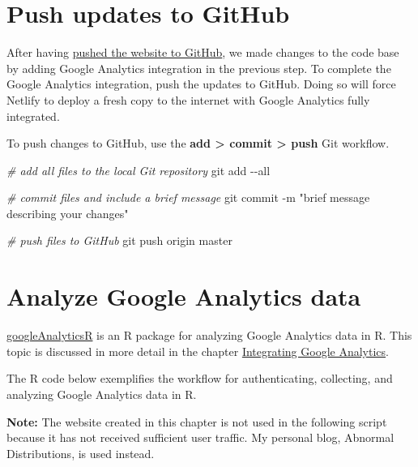 \documentclass[
]{book}
\newenvironment{Shaded}{\begin{snugshade}}{\end{snugshade}}
\newcommand{\AttributeTok}[1]{\textcolor[rgb]{0.77,0.63,0.00}{#1}}
\newcommand{\CommentTok}[1]{\textcolor[rgb]{0.56,0.35,0.01}{\textit{#1}}}
\newcommand{\FunctionTok}[1]{\textcolor[rgb]{0.00,0.00,0.00}{#1}}
\newcommand{\NormalTok}[1]{#1}
\newcommand{\StringTok}[1]{\textcolor[rgb]{0.31,0.60,0.02}{#1}}
\begin{document}
\hypertarget{push-updates-to-github}{%
\section{Push updates to GitHub}\label{push-updates-to-github}}

After having \protect\hyperlink{push-demo}{pushed the website to GitHub}, we made changes to the code base by adding Google Analytics integration in the previous step. To complete the Google Analytics integration, push the updates to GitHub. Doing so will force Netlify to deploy a fresh copy to the internet with Google Analytics fully integrated.

To push changes to GitHub, use the \textbf{add \textgreater{} commit \textgreater{} push} Git workflow.

\begin{Shaded}
\begin{Highlighting}[]
\CommentTok{\# add all files to the local Git repository}
\FunctionTok{git}\NormalTok{ add }\AttributeTok{{-}{-}all}

\CommentTok{\# commit files and include a brief message}
\FunctionTok{git}\NormalTok{ commit }\AttributeTok{{-}m} \StringTok{"brief message describing your changes"}

\CommentTok{\# push files to GitHub}
\FunctionTok{git}\NormalTok{ push origin master}
\end{Highlighting}
\end{Shaded}

\hypertarget{analyze-google-analytics-data}{%
\section{Analyze Google Analytics data}\label{analyze-google-analytics-data}}

\href{https://code.markedmondson.me/googleAnalyticsR/}{googleAnalyticsR} is an R package for analyzing Google Analytics data in R. This topic is discussed in more detail in the chapter \protect\hyperlink{google-analytics}{Integrating Google Analytics}.

The R code below exemplifies the workflow for authenticating, collecting, and analyzing Google Analytics data in R.

\textbf{Note:} The website created in this chapter is not used in the following script because it has not received sufficient user traffic. My personal blog, Abnormal Distributions, is used instead.
\end{document}
